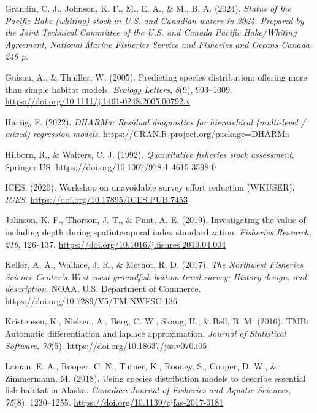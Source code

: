 \documentclass[
]{article}
\newlength{\cslhangindent}
\newlength{\cslentryspacingunit} %
\newenvironment{CSLReferences}[2] %
 {%
  \setlength{\parindent}{0pt}
  \ifodd #1
  \let\oldpar\par
  \def\par{\hangindent=\cslhangindent\oldpar}
  \fi
  \setlength{\parskip}{#2\cslentryspacingunit}
 }%
 {}
\begin{document}
\begin{CSLReferences}{1}{0}
\leavevmode{}%
Grandin, C. J., Johnson, K. F., M., E. A., \& M., B. A. (2024).
\emph{{Status of the Pacific Hake (whiting) stock in U.S. and Canadian
waters in 2024. Prepared by the Joint Technical Committee of the U.S.
and Canada Pacific Hake/Whiting Agreement, National Marine Fisheries
Service and Fisheries and Oceans Canada. 246 p.}}

\leavevmode{}%
Guisan, A., \& Thuiller, W. (2005). {Predicting species distribution:
offering more than simple habitat models}. \emph{Ecology Letters},
\emph{8}(9), 993--1009.
\url{https://doi.org/10.1111/j.1461-0248.2005.00792.x}

\leavevmode{}%
Hartig, F. (2022). \emph{{DHARMa: Residual diagnostics for hierarchical
(multi-level / mixed) regression models}}.
\url{https://CRAN.R-project.org/package=DHARMa}

\leavevmode{}%
Hilborn, R., \& Walters, C. J. (1992). \emph{{Quantitative fisheries
stock assessment}}. Springer US.
\url{https://doi.org/10.1007/978-1-4615-3598-0}

\leavevmode{}%
ICES. (2020). {Workshop on unavoidable survey effort reduction
(WKUSER)}. \emph{ICES}. \url{https://doi.org/10.17895/ICES.PUB.7453}

\leavevmode{}%
Johnson, K. F., Thorson, J. T., \& Punt, A. E. (2019). {Investigating
the value of including depth during spatiotemporal index
standardization}. \emph{Fisheries Research}, \emph{216}, 126--137.
\url{https://doi.org/10.1016/j.fishres.2019.04.004}

\leavevmode{}%
Keller, A. A., Wallace, J. R., \& Methot, R. D. (2017). \emph{{The
Northwest Fisheries Science Center's West coast groundfish bottom trawl
survey: History design, and description}}. NOAA, U.S. Department of
Commerce. \url{https://doi.org/10.7289/V5/TM-NWFSC-136}

\leavevmode{}%
Kristensen, K., Nielsen, A., Berg, C. W., Skaug, H., \& Bell, B. M.
(2016). {TMB: Automatic differentiation and laplace approximation}.
\emph{Journal of Statistical Software}, \emph{70}(5).
\url{https://doi.org/10.18637/jss.v070.i05}

\leavevmode{}%
Laman, E. A., Rooper, C. N., Turner, K., Rooney, S., Cooper, D. W., \&
Zimmermann, M. (2018). {Using species distribution models to describe
essential fish habitat in Alaska}. \emph{Canadian Journal of Fisheries
and Aquatic Sciences}, \emph{75}(8), 1230--1255.
\url{https://doi.org/10.1139/cjfas-2017-0181}


\end{CSLReferences}
\end{document}
